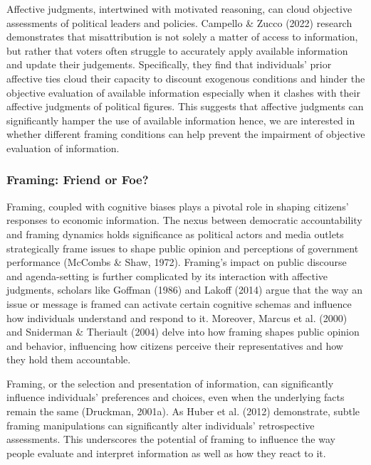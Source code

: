 \documentclass[
]{article}
\begin{document}
Affective judgments, intertwined with motivated reasoning, can cloud
objective assessments of political leaders and policies. Campello \&
Zucco (2022) research demonstrates that misattribution is not solely a
matter of access to information, but rather that voters often struggle
to accurately apply available information and update their judgements.
Specifically, they find that individuals' prior affective ties cloud
their capacity to discount exogenous conditions and hinder the objective
evaluation of available information especially when it clashes with
their affective judgments of political figures. This suggests that
affective judgments can significantly hamper the use of available
information hence, we are interested in whether different framing
conditions can help prevent the impairment of objective evaluation of
information.

\hypertarget{framing-friend-or-foe}{%
\subsubsection{Framing: Friend or Foe?}\label{framing-friend-or-foe}}

Framing, coupled with cognitive biases plays a pivotal role in shaping
citizens' responses to economic information. The nexus between
democratic accountability and framing dynamics holds significance as
political actors and media outlets strategically frame issues to shape
public opinion and perceptions of government performance (McCombs \&
Shaw, 1972). Framing's impact on public discourse and agenda-setting is
further complicated by its interaction with affective judgments,
scholars like Goffman (1986) and Lakoff (2014) argue that the way an
issue or message is framed can activate certain cognitive schemas and
influence how individuals understand and respond to it. Moreover, Marcus
et al. (2000) and Sniderman \& Theriault (2004) delve into how framing
shapes public opinion and behavior, influencing how citizens perceive
their representatives and how they hold them accountable.

Framing, or the selection and presentation of information, can
significantly influence individuals' preferences and choices, even when
the underlying facts remain the same (Druckman, 2001a). As Huber et al.
(2012) demonstrate, subtle framing manipulations can significantly alter
individuals' retrospective assessments. This underscores the potential
of framing to influence the way people evaluate and interpret
information as well as how they react to it.
\end{document}
